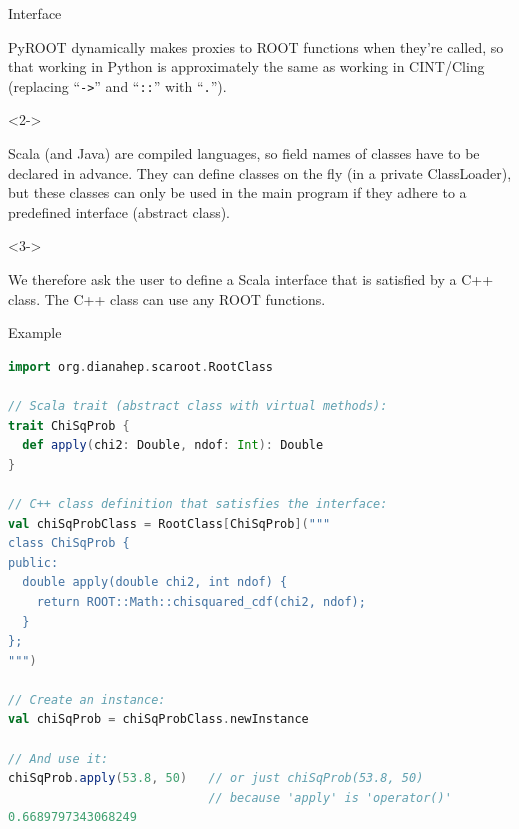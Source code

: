 \documentclass{beamer}
\begin{document}
\begin{frame}{Interface}

\begin{block}{}
\vspace{-\baselineskip}
PyROOT dynamically makes proxies to ROOT functions when they're called, so that working in Python is approximately the same as working in CINT/Cling (replacing ``{\tt ->}'' and ``{\tt ::}'' with ``{\tt .}'').
\end{block}

\vfill
\begin{uncoverenv}<2->
\begin{block}{}
\vspace{-\baselineskip}
Scala (and Java) are compiled languages, so field names of classes have to be declared in advance. They can define classes on the fly (in a private ClassLoader), but these classes can only be used in the main program if they adhere to a predefined interface (abstract class).
\end{block}
\end{uncoverenv}

\vfill
\begin{uncoverenv}<3->
\begin{block}{}
\vspace{-\baselineskip}
We therefore ask the user to define a Scala interface that is satisfied by a C++ class. The C++ class can use any ROOT functions.
\end{block}
\end{uncoverenv}
\end{frame}

\begin{frame}[fragile]{Example}
\begin{lstlisting}[language=scala]
import org.dianahep.scaroot.RootClass

// Scala trait (abstract class with virtual methods):
trait ChiSqProb {
  def apply(chi2: Double, ndof: Int): Double
}

// C++ class definition that satisfies the interface:
val chiSqProbClass = RootClass[ChiSqProb]("""
class ChiSqProb {
public:
  double apply(double chi2, int ndof) {
    return ROOT::Math::chisquared_cdf(chi2, ndof);
  }
};
""")

// Create an instance:
val chiSqProb = chiSqProbClass.newInstance

// And use it:
chiSqProb.apply(53.8, 50)   // or just chiSqProb(53.8, 50)
                            // because 'apply' is 'operator()'
0.6689797343068249
\end{lstlisting}
\end{frame}
\end{document}
